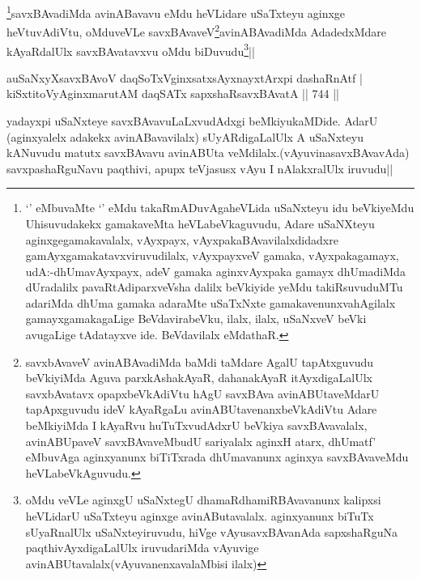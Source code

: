 \begin{artha}
\footnote{`\stext' eMbuvaMte `\stext' eMdu takaRmADuvAgaheVLida uSaNxteyu idu beVkiyeMdu Uhisuvudakekx gamakaveMta heVLabeVkaguvudu, Adare uSaNXteyu aginxgegamakavalalx, vAyxpayx, vAyxpakaBAvavilalxdidadxre gamAyxgamakatavxviruvudilalx, vAyxpayxveV gamaka, vAyxpakagamayx, udA:-dhUmavAyxpayx, adeV gamaka aginxvAyxpaka gamayx dhUmadiMda dUradalilx pavaRtAdiparxveVsha dalilx beVkiyide yeMdu takiRsuvuduMTu adariMda dhUma gamaka adaraMte uSaTxNxte gamakavenunxvahAgilalx gamayxgamakagaLige BeVdavirabeVku, ilalx, ilalx, uSaNxveV beVki avugaLige tAdatayxve ide. BeVdavilalx eMdathaR.}savxBAvadiMda avinABavavu eMdu heVLidare uSaTxteyu aginxge heVtuvAdiVtu, oMduveVLe savxBAvaveV\footnote{savxbAvaveV avinABAvadiMda baMdi taMdare AgalU tapAtxguvudu beVkiyiMda Aguva parxkAshakAyaR, dahanakAyaR itAyxdigaLalUlx savxbAvatavx opapxbeVkAdiVtu hAgU savxBAva avinABUtaveMdarU tapApxguvudu ideV kAyaRgaLu avinABUtavenanxbeVkAdiVtu Adare beMkiyiMda I kAyaRvu huTuTxvudAdxrU beVkiya savxBAvavalalx, avinABUpaveV savxBAvaveMbudU sariyalalx aginxH atarx, dhUmatf' eMbuvAga aginxyanunx biTiTxrada dhUmavanunx aginxya savxBAvaveMdu heVLabeVkAguvudu.}avinABAvadiMda AdadedxMdare kAyaRdalUlx savxBAvatavxvu oMdu biDuvudu\footnote{oMdu veVLe aginxgU uSaNxtegU dhamaRdhamiRBAvavanunx kalipxsi heVLidarU uSaTxteyu aginxge avinAButavalalx. aginxyanunx biTuTx sUyaRnalUlx uSaNxteyiruvudu, hiVge vAyusavxBAvanAda sapxshaRguNa paqthivAyxdigaLalUlx iruvudariMda vAyuvige avinABUtavalalx(vAyuvanenxavalaMbisi ilalx)}||
\end{artha}


\begin{shl}
auSaNxyXsavxBAvoV daqSoTxV\s ginxsatxsAyxnayxtArx\s pi dashaRnAtf | \\
kiSxtitoVyAginxmarutAM daqSATx sapxshaRsavxBAvatA \hfill||  744 ||  
\end{shl}

\begin{artha}
yadayxpi uSaNxteye savxBAvavuLaLxvudAdxgi beMkiyukaMDide. AdarU (aginxyalelx adakekx avinABavavilalx) sUyARdigaLalUlx A uSaNxteyu kANuvudu matutx savxBAvavu avinABUta veMdilalx.(vAyuvinasavxBAvavAda) savxpashaRguNavu paqthivi, apupx teVjasusx vAyu I nAlakxralUlx iruvudu||
\end{artha}


